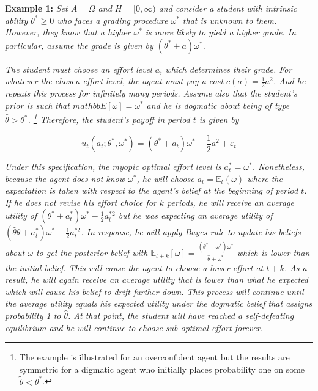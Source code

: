 \documentclass[
  12pt,
]{article}
\begin{document}
\textbf{Example 1: } \emph{Set \(A = \Omega\) and \(H = [0, \infty)\)
and consider a student with intrinsic ability \(\theta^*\geq 0\) who
faces a grading procedure \(\omega^*\) that is unknown to them. However,
they know that a higher \(\omega^*\) is more likely to yield a higher
grade. In particular, assume the grade is given by
\((\theta^*+a)\omega^*\).}

\emph{The student must choose an effort level \(a\), which determines
their grade. For whatever the chosen effort level, the agent must pay a
cost \(c(a) = \frac{1}{2}a^2\). And he repeats this process for
infinitely many periods. Assume also that the student's prior is such
that \(mathbb{E}[\omega]= \omega^*\) and he is dogmatic about being of
type \(\hat{\theta}>\theta^*\).
\footnote{The example is illustrated for an overconfident agent but the results are symmetric for a digmatic agent who initially 
places probability one on some $\tilde{\theta}<\theta^*$.} Therefore,
the student's payoff in period \(t\) is given by }

\begin{equation}
u_t(a_t; \theta^*, \omega^*) = (\theta^*+a_t)\omega^* - \frac{1}{2}a^2 + \varepsilon_t
\end{equation}

\emph{Under this specification, the myopic optimal effort level is
\(a_t^* = \omega^*\). Nonetheless, because the agent does not know
\(\omega^*\), he will choose \(a_t = \mathbb{E}_t(\omega)\) where the
expectation is taken with respect to the agent's belief at the beginning
of period \(t\). If he does not revise his effort choice for \(k\)
periods, he will receive an average utility of
\((\theta^*+a_t^*)\omega^* - \frac{1}{2}a_t^{*2}\) but he was expecting
an average utility of
\((\hat{\theta}\theta+a_t^*)\omega^* - \frac{1}{2}a_t^{*2}\). In
response, he will apply Bayes rule to update his beliefs about
\(\omega\) to get the posterior belief with
\(\mathbb{E}_{t+k}[\omega] = \frac{(\theta^{*} + \omega^{*})\omega^{*}}{\hat{\theta} + \omega^{*}}\)
which is lower than the initial belief. This will cause the agent to
choose a lower effort at \(t+k\). As a result, he will again receive an
average utility that is lower than what he expected which will cause his
belief to drift further down. This process will continue until the
average utility equals his expected utility under the dogmatic belief
that assigns probability 1 to \(\hat{\theta}\). At that point, the
student will have reached a self-defeating equilibrium and he will
continue to choose sub-optimal effort forever. }
\end{document}
